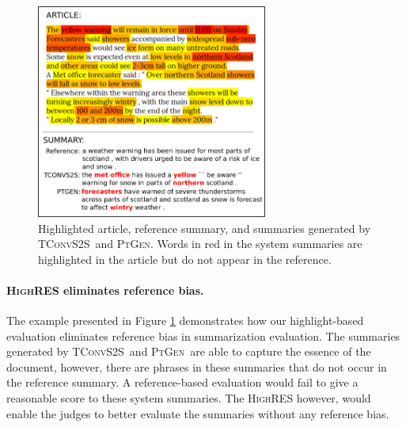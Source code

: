 \documentclass[11pt,a4paper]{article}
\newcommand\highres{\textsc{HighRES}}
\newcommand\ptgen{\textsc{PtGen}}
\newcommand\tconv{\textsc{TConvS2S}}
\begin{document}
\begin{figure}[h]
    \centering
    \includegraphics[width=7.6cm]{heatmap_summ_small_2}
    \caption{Highlighted article, reference summary, and summaries generated by \tconv\ and \ptgen. Words in red in the system summaries are highlighted in the article but do not appear in the reference.}
  \label{image:heatmap_small_2}
\end{figure}

\paragraph{\highres{} eliminates reference bias.}
The example presented in Figure \ref{image:heatmap_small_2} demonstrates how our highlight-based evaluation eliminates reference bias in summarization evaluation. The summaries generated by \tconv\ and \ptgen\ are able to capture the essence of the document, however, there are phrases in these summaries that do not occur in the reference summary. A reference-based evaluation would fail to give a reasonable score to these system summaries. The \highres{} however, would enable the judges to better evaluate the summaries without any reference bias.
\end{document}
